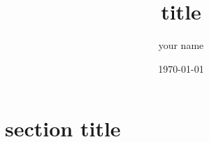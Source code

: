 \documentclass[a4j,10pt]{jsarticle}
\title{title}
\author{your name}
\date{\today}
\begin{document}
\maketitle


\section{section title}
\end{document}
